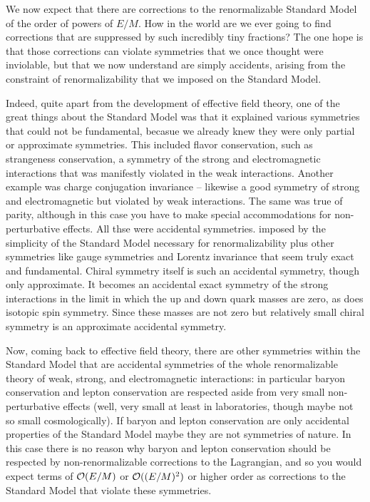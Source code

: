 We now expect that there are corrections to the renormalizable Standard Model of the order of powers of $E/M$. How in the world are we ever going to find corrections that are suppressed by such incredibly tiny fractions? The one hope  is that those corrections can violate symmetries that we once thought were inviolable, but that we now understand are simply accidents, arising from the constraint of renormalizability that we imposed on the Standard Model.  

Indeed, quite apart from the development of effective field theory, one of the great things about the 
Standard Model was that it explained  various symmetries that could not be fundamental, becasue  we already knew they were only partial or approximate symmetries.  This included  flavor conservation, such as strangeness conservation,  a symmetry of the strong and electromagnetic interactions that was manifestly violated in the weak interactions.  Another example was charge conjugation invariance -- likewise a good symmetry of strong and electromagnetic but violated by weak interactions. The same was true of parity, although in this case you have to make special accommodations for non-perturbative effects.  All thse were accidental symmetries.  imposed  by the simplicity of the Standard Model necessary for renormalizability plus  other symmetries like gauge symmetries and Lorentz invariance that seem truly exact and fundamental.  
Chiral symmetry itself is such an accidental symmetry, though only approximate. It becomes an accidental exact symmetry of the strong interactions in the limit in which  the up and down quark masses are zero, as does isotopic spin symmetry. Since these masses  are not zero but relatively small chiral symmetry is an approximate accidental symmetry.  

Now, coming back to effective field theory, there are other symmetries within the Standard Model that are accidental symmetries of the whole renormalizable theory of weak, strong, and electromagnetic interactions: in particular baryon conservation and lepton conservation are respected aside from very small non-perturbative effects  (well, very small at least in laboratories, though maybe not so small cosmologically). If baryon and lepton conservation  are only accidental properties of the Standard Model maybe they are not symmetries of nature. In this case there is no reason why baryon and lepton conservation should be respected by  non-renormalizable corrections  to the Lagrangian, and so you would expect terms of ${\cal O}(E/M)$ or ${\cal O}((E/M)^2)$ or  higher order as corrections to the Standard Model that violate these symmetries.


